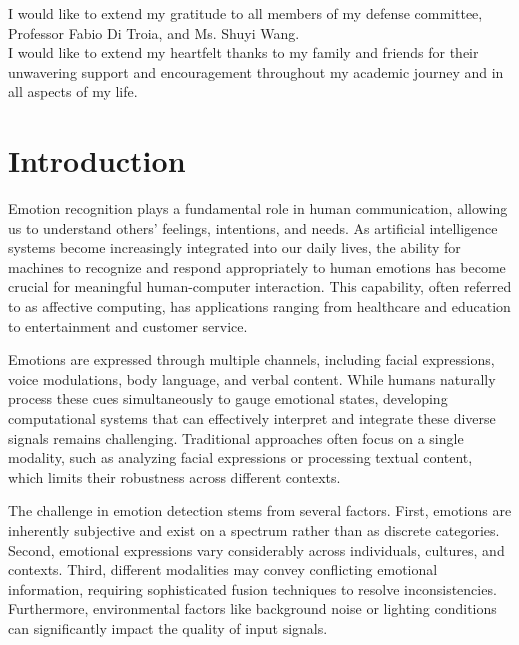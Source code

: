 \documentclass[12pt]{article}
\begin{document}
\noindent
I would like to extend my gratitude to all members of my defense committee, Professor Fabio Di Troia, and Ms. Shuyi Wang.\\

\noindent  
I would like to extend my heartfelt thanks to my family and friends for their unwavering support and encouragement throughout my academic journey and in all aspects of my life.

\bigskip

\newpage
\tableofcontents
\newpage
\bigskip
\listoffigures
\listoftables


\newpage
\vspace{-0.1in}
\section{Introduction}
\label{sec:intro}
Emotion recognition plays a fundamental role in human communication, allowing us to understand others' feelings, intentions, and needs. As artificial intelligence systems become increasingly integrated into our daily lives, the ability for machines to recognize and respond appropriately to human emotions has become crucial for meaningful human-computer interaction. This capability, often referred to as affective computing, has applications ranging from healthcare and education to entertainment and customer service.

Emotions are expressed through multiple channels, including facial expressions, voice modulations, body language, and verbal content. While humans naturally process these cues simultaneously to gauge emotional states, developing computational systems that can effectively interpret and integrate these diverse signals remains challenging. Traditional approaches often focus on a single modality, such as analyzing facial expressions or processing textual content, which limits their robustness across different contexts.

The challenge in emotion detection stems from several factors. First, emotions are inherently subjective and exist on a spectrum rather than as discrete categories. Second, emotional expressions vary considerably across individuals, cultures, and contexts. Third, different modalities may convey conflicting emotional information, requiring sophisticated fusion techniques to resolve inconsistencies. Furthermore, environmental factors like background noise or lighting conditions can significantly impact the quality of input signals.
\end{document}
